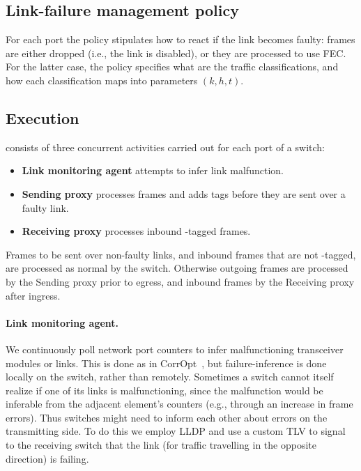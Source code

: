 \subsection{Link-failure management policy}
\label{sec:policy}
For each port the policy stipulates how to react if the link becomes
faulty: frames are either dropped (i.e., the link is disabled), or they are
processed to use FEC.
For the latter case, the policy specifies what are the traffic classifications,
and how each classification maps into parameters $(k, h, t)$.
%


\subsection{Execution}
\OurSys consists of three concurrent activities carried out for each port of a
switch:
\begin{itemize}
  \item \textbf{Link monitoring agent} attempts to infer link malfunction.
  \item \textbf{Sending proxy} processes frames and adds tags before they are sent over a faulty link.
  \item \textbf{Receiving proxy} processes inbound \OurSys-tagged frames.
\end{itemize}

Frames to be sent over non-faulty links, and inbound frames that are not
\OurSys-tagged, are processed as normal by the switch. Otherwise outgoing frames
are processed by the Sending proxy prior to egress, and inbound frames by
the Receiving proxy after ingress.

\paragraph{Link monitoring agent.}
  We continuously poll network port counters to infer malfunctioning transceiver
  modules or links. This is done as in
  CorrOpt~\cite{Zhuo:2017:UMP:3098822.3098849}, but failure-inference is done
  locally on the switch, rather than remotely.
  Sometimes a switch cannot itself realize if one of its links is
  malfunctioning, since the malfunction would be inferable from the adjacent
  element's counters (e.g., through an increase in frame errors). Thus switches
  might need to inform each other about errors on the transmitting side. To do
  this we employ LLDP and use a custom TLV to signal to the receiving switch
  that the link (for traffic travelling in the opposite direction) is failing.

